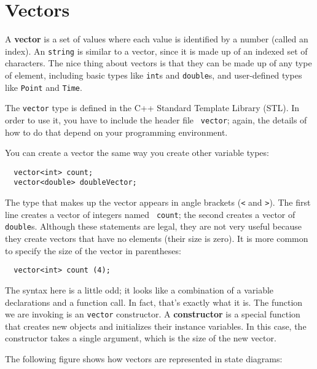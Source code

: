

\chapter{Vectors}
\label{vectors}

A {\bf vector} is a set of values where each value is identified by a
number (called an index).  An {\tt string} is similar to a vector,
since it is made up of an indexed set of characters.  The nice thing
about vectors is that they can be made up of any type of element,
including basic types like {\tt int}s and {\tt double}s, 
and user-defined types like {\tt Point} and {\tt Time}.

The {\tt vector} type is defined in the C++ Standard Template Library (STL).
In order to use it, you have to include the header file {\tt
vector}; again, the details of how to do that depend on your
programming environment.

You can create a vector the same way you create other variable types:

\begin{lstlisting}
  vector<int> count;
  vector<double> doubleVector;
\end{lstlisting}
%
The type that makes up the vector appears in angle brackets ({\tt <}
and {\tt >}).  The first line creates a vector of integers named {\tt
count}; the second creates a vector of {\tt double}s.  Although these
statements are legal, they are not very useful because they create
vectors that have no elements (their size is zero).  It is more
common to specify the size of the vector in parentheses:

\begin{lstlisting}
  vector<int> count (4);
\end{lstlisting}
%
The syntax here is a little odd; it looks like a combination of a
variable declarations and a function call.  In fact, that's exactly
what it is.  The function we are invoking is an {\tt vector}
constructor.  A {\bf constructor} is a special function that creates
new objects and initializes their instance variables.  In this case,
the constructor takes a single argument, which is the size of the new
vector.


The following figure shows how vectors are represented in state
diagrams:

